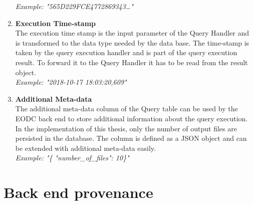 \documentclass[draft,final]{vutinfth} %
\begin{document}
\begin{enumerate}
	\textit{Example: "565D229FCE4772869343\dots"} 
	\item \textbf{Execution Time-stamp} \\
	The execution time stamp is the input parameter of the Query Handler and is transformed to the data type needed by the data base. The time-stamp is taken by the query execution handler and is part of the query execution result. To forward it to the Query Handler it has to be read from the result object. \\
	\textit{Example: "2018-10-17 18:03:20,609"}  
	\item \textbf{Additional Meta-data} \\
	The additional meta-data column of the Query table can be used by the EODC back end to store additional information about the query execution. In the implementation of this thesis, only the number of output files are persisted in the database. The column is defined as a JSON object and can be extended with additional meta-data easily. \\
	\textit{Example: "\{ "number\_of\_files": 10\}"}    	 
\end{enumerate}

\section{Back end provenance}\label{Implementation:Back end provenance}
\end{document}
